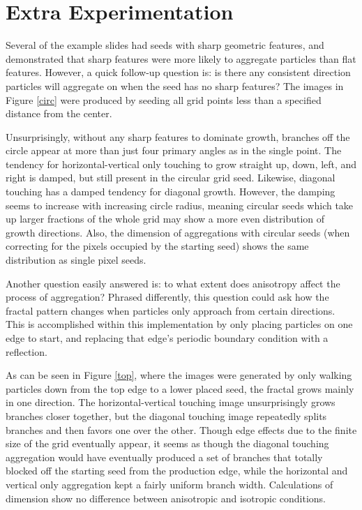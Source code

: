 \documentclass[12pt]{article}
\begin{document}
\section*{Extra Experimentation}


Several of the example slides had seeds with sharp geometric features, and demonstrated that sharp features were more likely to aggregate particles than flat features.
However, a quick follow-up question is: is there any consistent direction particles will aggregate on when the seed has no sharp features?
The images in Figure \ref{circ} were produced by seeding all grid points less than a specified distance from the center.

Unsurprisingly, without any sharp features to dominate growth, branches off the circle appear at more than just four primary angles as in the single point.
The tendency for horizontal-vertical only touching to grow straight up, down, left, and right is damped, but still present in the circular grid seed.
Likewise, diagonal touching has a damped tendency for diagonal growth.
However, the damping seems to increase with increasing circle radius, meaning circular seeds which take up larger fractions of the whole grid may show a more even distribution of growth directions.
Also, the dimension of aggregations with circular seeds (when correcting for the pixels occupied by the starting seed) shows the same distribution as single pixel seeds.

Another question easily answered is: to what extent does anisotropy affect the process of aggregation?  
Phrased differently, this question could ask how the fractal pattern changes when particles only approach from certain directions.
This is accomplished within this implementation by only placing particles on one edge to start, and replacing that edge's periodic boundary condition with a reflection.

As can be seen in Figure \ref{top}, where the images were generated by only walking particles down from the top edge to a lower placed seed, the fractal grows mainly in one direction.
The horizontal-vertical touching image unsurprisingly grows branches closer together, but the diagonal touching image repeatedly splits branches and then favors one over the other.
Though edge effects due to the finite size of the grid eventually appear, it seems as though the diagonal touching aggregation would have eventually produced a set of branches that totally blocked off the starting seed from the production edge, while the horizontal and vertical only aggregation kept a fairly uniform branch width.
Calculations of dimension show no difference between anisotropic and isotropic conditions.
\end{document}
